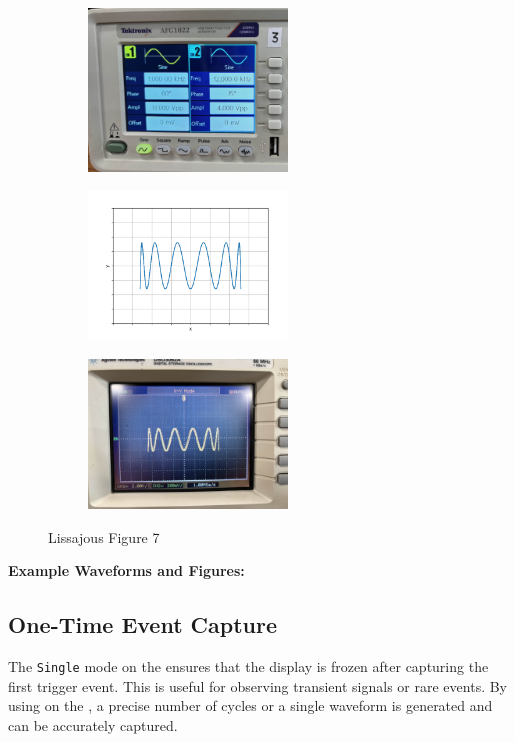 \documentclass[a4paper,12pt]{article}
\begin{document}
\begin{figure}[h!]
	\begin{subfigure}[b]{10pt}
		\includegraphics[width = 150pt]{figs/fig7.jpeg}
	\end{subfigure}
	\hspace{120pt}
	\begin{subfigure}[b]{10pt}
		\includegraphics[width = 150pt]{figs/fig7.png}
	\end{subfigure}
	\hspace{130pt}
	\begin{subfigure}[b]{10pt}
		\includegraphics[width = 150pt]{figs/fig7_1.jpeg}
	\end{subfigure}
	\caption{Lissajous Figure 7}
\end{figure}        
\textbf{Example Waveforms and Figures:}



\noindent{}

\subsection*{One-Time Event Capture}
The \texttt{Single} mode on the  ensures that the display is frozen after capturing the first trigger event. This is useful for observing transient signals or rare events. By using  on the , a precise number of cycles or a single waveform is generated and can be accurately captured.
\end{document}
